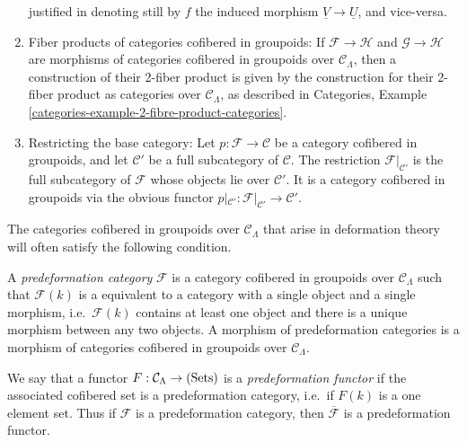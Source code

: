 \begin{remarks}
\begin{enumerate}
justified in denoting still by $f$ the induced morphism $\underline{V} 
\rightarrow \underline{U}$, and vice-versa.
\item Fiber products of categories cofibered in groupoids: If $\mathcal F 
\rightarrow \mathcal H$ and $\mathcal G \rightarrow \mathcal H$ are morphisms 
of categories cofibered in groupoids over $\mathcal C_{\Lambda}$, then a 
construction of their 2-fiber product is given by the construction for their 
2-fiber product as categories over $\mathcal C_{\Lambda}$, as described in 
Categories, Example \ref{categories-example-2-fibre-product-categories}.
\item 
\label{definition-restricting-base-category}
Restricting the base category: Let $p : \mathcal F \rightarrow \mathcal C$ be a 
category cofibered in groupoids, and let $\mathcal C'$ be a full subcategory of 
$\mathcal C$.  The restriction $\mathcal F|_{\mathcal C'}$ is the full 
subcategory of $\mathcal F$ whose objects lie over $\mathcal C'$. It is a 
category cofibered in groupoids via the obvious functor $p|_{\mathcal C'}: 
\mathcal F|_{\mathcal C'} \rightarrow \mathcal C'$.
\end{enumerate}
\end{remarks}

\noindent
The categories cofibered in groupoids over $\mathcal C_{\Lambda}$ that arise in 
deformation theory will often satisfy the following condition.

\begin{definition}
\label{definition-predeformation-category}
A \emph{predeformation category} $\mathcal F$ is a category cofibered in 
groupoids over $\mathcal C_{\Lambda}$ such that $\mathcal F(k)$ is a equivalent 
to a category with a single object and a single morphism, i.e.\ $\mathcal F(k)$ 
contains at least one object and there is a unique morphism between any two 
objects. A morphism of predeformation categories is a morphism of categories 
cofibered in groupoids over $\mathcal C_{\Lambda}$.
\end{definition}

\begin{remark}
We say that a functor $F: \mathcal C_{\Lambda} \rightarrow \textnormal{(Sets)}$ 
is a \emph{predeformation functor} if the associated cofibered set is a 
predeformation category, i.e.\ if $F(k)$ is a one element set.  Thus if 
$\mathcal F$ is a predeformation category, then $\overline{\mathcal F}$ is a 
predeformation functor.
\end{remark}

